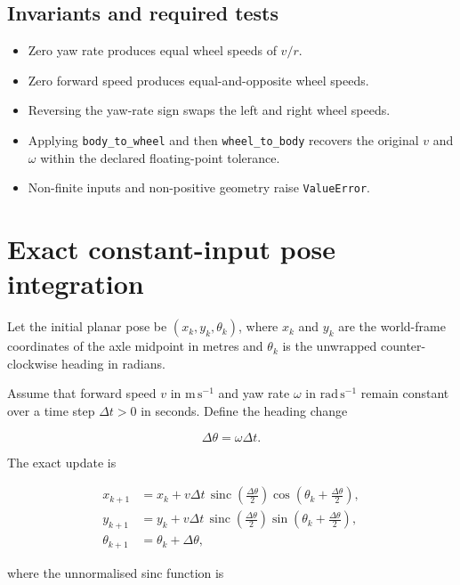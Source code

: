 \documentclass[
  australian,
  12pt,
  letterpaper,
  DIV=11,
  numbers=noendperiod,
  twoside]{scrreprt}
\providecommand{\tightlist}{%
  \setlength{\itemsep}{0pt}\setlength{\parskip}{0pt}}
\begin{document}
\subsection{Invariants and required
tests}\label{invariants-and-required-tests}

\begin{itemize}
\tightlist
\item
  Zero yaw rate produces equal wheel speeds of \(v/r\).
\item
  Zero forward speed produces equal-and-opposite wheel speeds.
\item
  Reversing the yaw-rate sign swaps the left and right wheel speeds.
\item
  Applying \texttt{body\_to\_wheel} and then \texttt{wheel\_to\_body}
  recovers the original \(v\) and \(\omega\) within the declared
  floating-point tolerance.
\item
  Non-finite inputs and non-positive geometry raise \texttt{ValueError}.
\end{itemize}

\section{Exact constant-input pose
integration}\label{exact-constant-input-pose-integration}

Let the initial planar pose be \((x_k,y_k,\theta_k)\), where \(x_k\) and
\(y_k\) are the world-frame coordinates of the axle midpoint in metres
and \(\theta_k\) is the unwrapped counter-clockwise heading in radians.

Assume that forward speed \(v\) in \(\mathrm{m\,s^{-1}}\) and yaw rate
\(\omega\) in \(\mathrm{rad\,s^{-1}}\) remain constant over a time step
\(\Delta t>0\) in seconds. Define the heading change

\[
\Delta\theta
=
\omega\Delta t.
\]

The exact update is

\[
\begin{aligned}
x_{k+1}
&=
x_k+
v\Delta t\,
\operatorname{sinc}\left(\frac{\Delta\theta}{2}\right)
\cos\left(\theta_k+\frac{\Delta\theta}{2}\right),\\
y_{k+1}
&=
y_k+
v\Delta t\,
\operatorname{sinc}\left(\frac{\Delta\theta}{2}\right)
\sin\left(\theta_k+\frac{\Delta\theta}{2}\right),\\
\theta_{k+1}
&=
\theta_k+\Delta\theta,
\end{aligned}
\]

where the unnormalised sinc function is
\end{document}

